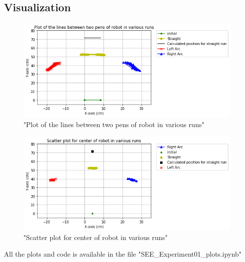 \documentclass[10pt,a4paper]{article}
\begin{document}
	 \subsection{Visualization}
		 \begin{figure}[H]
		 	\caption{"Plot of the lines between two pens of robot in various runs"}
		 	\includegraphics[scale=0.5]{line_plot.png}
		 \end{figure}
		 \begin{figure}[H]
		 	\caption{"Scatter plot for center of robot in various runs"}
		 	\includegraphics[scale=0.5]{scatter_plot.png}
		 \end{figure}
	 All the plots and code is available in the file "SEE\_Experiment01\_plots.ipynb"		
\end{document}
